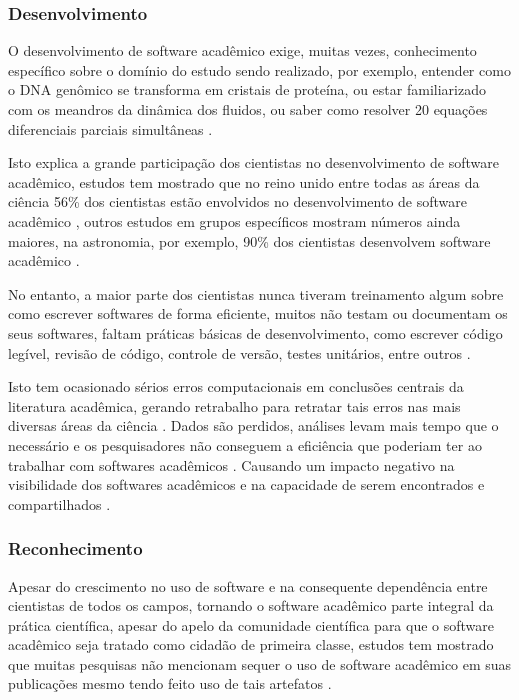 \subsubsection{Desenvolvimento}

O desenvolvimento de software acadêmico exige, muitas vezes, conhecimento
específico sobre o domínio do estudo sendo realizado,
por exemplo, entender como o DNA genômico
se transforma em cristais de proteína, ou estar familiarizado com os meandros
da dinâmica dos fluidos, ou saber como resolver 20 equações diferenciais
parciais simultâneas \cite{segal2008developing}.

Isto explica a grande participação dos cientistas no desenvolvimento de
software acadêmico, estudos tem mostrado que no reino unido entre todas as
áreas da ciência 56\% dos cientistas estão envolvidos no desenvolvimento de
software acadêmico \cite{hettrick2014uk}, outros estudos em grupos específicos mostram números ainda
maiores, na astronomia, por exemplo, 90\% dos cientistas desenvolvem software
acadêmico \cite{momcheva2015software}.

No entanto, a maior parte dos cientistas nunca tiveram treinamento algum sobre como escrever
softwares de forma eficiente, muitos não testam ou documentam os seus
softwares, faltam práticas básicas de desenvolvimento, como escrever código
legível, revisão de código, controle de versão, testes unitários, entre outros
\cite{wilson2017good}.

Isto tem ocasionado sérios erros computacionais em conclusões centrais da
literatura acadêmica, gerando retrabalho para retratar tais erros nas mais
diversas áreas da ciência \cite{merali2010computational}.
Dados são perdidos, análises levam mais tempo que o necessário e os
pesquisadores não conseguem a eficiência que poderiam ter ao trabalhar com
softwares acadêmicos \cite{wilson2017good}.
Causando um impacto negativo na visibilidade dos softwares acadêmicos e na
capacidade de serem encontrados e compartilhados \cite{howison2013incentives,
katz2014transitive}.

\subsubsection{Reconhecimento}


Apesar do crescimento no uso de software e na consequente dependência entre
cientistas de todos os campos, tornando o software acadêmico parte integral da
prática científica, apesar do apelo da comunidade científica para que o
software acadêmico seja tratado como cidadão de primeira classe, estudos tem
mostrado que muitas pesquisas não mencionam sequer o uso de software acadêmico
em suas publicações mesmo tendo feito uso de tais artefatos
\cite{momcheva2015software} \cite{howison2016software}.

